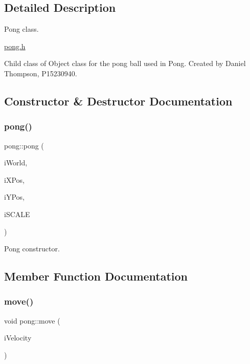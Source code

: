 \subsection{Detailed Description}
Pong class. 

\hyperlink{pong_8h}{pong.\+h}

Child class of Object class for the pong ball used in Pong. Created by Daniel Thompson, P15230940. 

\subsection{Constructor \& Destructor Documentation}
\mbox{\label{classpong_aba99737cd7a044d2d943501433229702}} 
\subsubsection{\texorpdfstring{pong()}{pong()}}
{\footnotesize\ttfamily pong\+::pong (\begin{DoxyParamCaption}\item[{b2\+World \&}]{i\+World,  }\item[{float}]{i\+X\+Pos,  }\item[{float}]{i\+Y\+Pos,  }\item[{double}]{i\+S\+C\+A\+LE }\end{DoxyParamCaption})}



Pong constructor. 



\subsection{Member Function Documentation}
\mbox{\label{classpong_a9b9d00c224e64244a82b4c2bcea0633b}} 
\subsubsection{\texorpdfstring{move()}{move()}}
{\footnotesize\ttfamily void pong\+::move (\begin{DoxyParamCaption}\item[{b2\+Vec2 \&}]{i\+Velocity }\end{DoxyParamCaption})}



